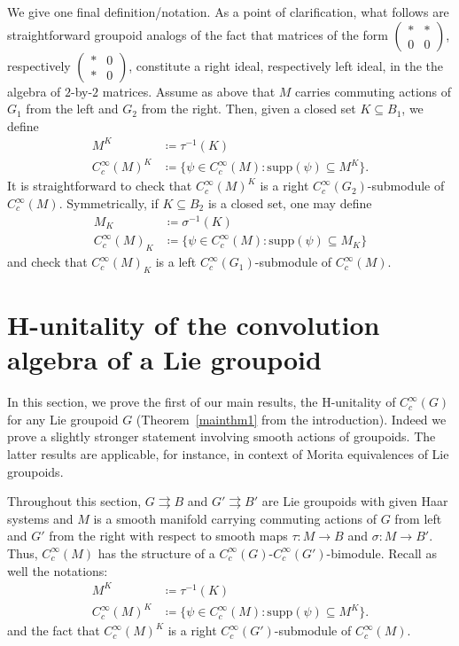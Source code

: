 \documentclass[12pt]{article}
\theoremstyle{plain}
\theoremstyle{definition}
\newcommand{\mat}[1]{\left( \begin{smallmatrix} #1 \end{smallmatrix} \right)}
\numberwithin{equation}{section}
\begin{document}
We give one final definition/notation.  As a point of clarification, what follows are straightforward groupoid analogs of the fact that matrices of the form $\mat{* & * \\0 & 0}$, respectively $\mat{* & 0 \\ * & 0}$, constitute a right ideal, respectively left ideal, in the the algebra of $2$-by-$2$ matrices. Assume as above that $M$ carries commuting actions of $G_1$ from the left and $G_2$ from the right. Then, given a closed set $K \subseteq B_1$, we define
\begin{align*}
M^{K} &\coloneqq \tau^{-1}(K) \\
C_c^\infty(M)^{K} &\coloneqq   \{ \psi \in C_c^\infty(M) : \mathrm{supp}(\psi) \subseteq M^{K} \}. 
\end{align*}
It is straightforward to check that $C_c^\infty(M)^{K}$ is a right $C_c^\infty(G_2)$-submodule of $C_c^\infty(M)$. Symmetrically, if $K \subseteq B_2$ is a closed set, one may define
\begin{align*}
M_{K} &\coloneqq \sigma^{-1}(K) \\
C_c^\infty(M)_{K} &\coloneqq   \{ \psi \in C_c^\infty(M) : \mathrm{supp}(\psi) \subseteq M_{K} \}
\end{align*}
and  check that $C_c^\infty(M)_{K}$ is a left $C_c^\infty(G_1)$-submodule of $C_c^\infty(M)$. 












\section{H-unitality of the convolution  algebra of a Lie groupoid}



In this section, we prove the first of our main results, the H-unitality of $C_c^\infty(G)$ for any Lie groupoid $G$ (Theorem~\ref{mainthm1} from the introduction). Indeed we prove a slightly stronger statement involving smooth actions of groupoids. The latter results are applicable, for instance, in  context of  Morita equivalences of Lie groupoids.


Throughout this section, $G\rightrightarrows B$ and $G'\rightrightarrows B'$ are Lie groupoids with given Haar systems and $M$ is a smooth manifold carrying commuting actions of $G$ from left and $G'$ from the right with respect to smooth maps $\tau:M \to B$ and $\sigma:M\to B'$. Thus, $C_c^\infty(M)$ has the structure of a $C_c^\infty(G)$-$C_c^\infty(G')$-bimodule. Recall as well the notations:
\begin{align*}
M^{K} &\coloneqq \tau^{-1}(K) \\
C_c^\infty(M)^{K} &\coloneqq   \{ \psi \in C_c^\infty(M) : \mathrm{supp}(\psi) \subseteq M^{K} \}. 
\end{align*}
 and the fact that $C_c^\infty(M)^{K}$ is a right $C_c^\infty(G')$-submodule of $C_c^\infty(M)$.
\end{document}
